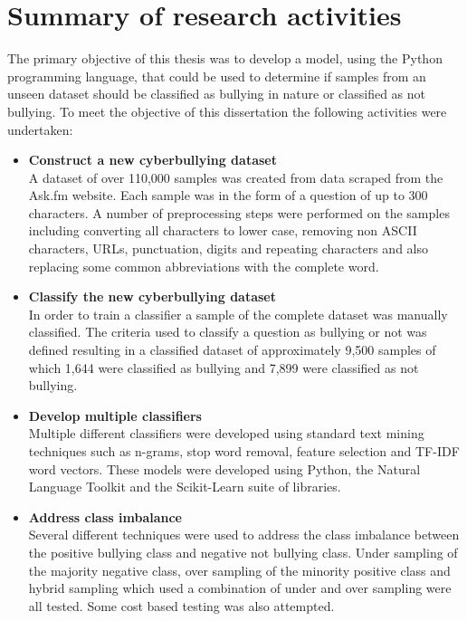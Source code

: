 \section{Summary of research activities}

The primary objective of this thesis was to develop a model, using the Python programming language, that could be used to determine if samples from an unseen dataset should be classified as bullying in nature or classified as not bullying. To meet the objective of this dissertation the following activities were undertaken:

\begin{itemize}

	\item \textbf{Construct a new cyberbullying dataset} \\
	A dataset of over 110,000 samples was created from data scraped from the Ask.fm website. Each sample was in the form of a question of up to 300 characters. A number of preprocessing steps were performed on the samples including converting all characters to lower case, removing non ASCII characters, URLs, punctuation, digits and repeating characters and also replacing some common abbreviations with the complete word. 
	
	\item \textbf{Classify the new cyberbullying dataset} \\
	In order to train a classifier a sample of the complete dataset was manually classified. The criteria used to classify a question as bullying or not was defined resulting in a classified dataset of approximately 9,500 samples of which 1,644 were classified as bullying and 7,899 were classified as not bullying.
	
	\item \textbf{Develop multiple classifiers} \\
	Multiple different classifiers were developed using standard text mining techniques such as n-grams, stop word removal, feature selection and TF-IDF word vectors. These models were developed using Python, the Natural Language Toolkit and the Scikit-Learn suite of libraries.
	
	\item \textbf{Address class imbalance} \\
	Several different techniques were used to address the class imbalance between the positive bullying class and negative not bullying class. Under sampling of the majority negative class, over sampling of the minority positive class and hybrid sampling which used a combination of under and over sampling were all tested. Some cost based testing was also attempted.
	

\end{itemize}
